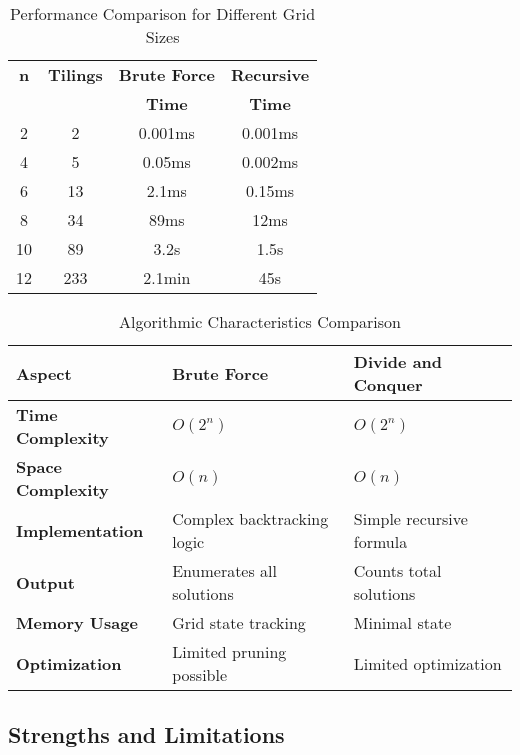 \documentclass[conference]{IEEEtran}
\begin{document}
\begin{table}[htbp]
\centering
\caption{Performance Comparison for Different Grid Sizes}
\label{tab:performance}
\renewcommand{\arraystretch}{1.5}
\begin{tabular}{|c|c|c|c|}
\hline
\textbf{n} & \textbf{Tilings} & \textbf{Brute Force} & \textbf{Recursive} \\
& & \textbf{Time} & \textbf{Time} \\
\hline
2 & 2 & 0.001ms & 0.001ms \\
\hline
4 & 5 & 0.05ms & 0.002ms \\
\hline
6 & 13 & 2.1ms & 0.15ms \\
\hline
8 & 34 & 89ms & 12ms \\
\hline
10 & 89 & 3.2s & 1.5s \\
\hline
12 & 233 & 2.1min & 45s \\
\hline
\end{tabular}
\end{table}

\vspace{1cm} %

\begin{table}[!htbp]
\centering
\caption{Algorithmic Characteristics Comparison}
\label{tab:algorithm_comparison}
\renewcommand{\arraystretch}{1.6}
\begin{tabular}{|p{2cm}|p{2cm}|p{2cm}|}
\hline
\textbf{Aspect} & \textbf{Brute Force} & \textbf{Divide and Conquer} \\
\hline
\textbf{Time Complexity} & $O(2^n)$ & $O(2^n)$ \\
\hline
\textbf{Space Complexity} & $O(n)$ & $O(n)$ \\
\hline
\textbf{Implementation} & Complex backtracking logic & Simple recursive formula \\
\hline
\textbf{Output} & Enumerates all solutions & Counts total solutions \\
\hline
\textbf{Memory Usage} & Grid state tracking & Minimal state \\
\hline
\textbf{Optimization} & Limited pruning possible & Limited optimization \\
\hline
\end{tabular}
\end{table}

\subsection{Strengths and Limitations}
\end{document}
